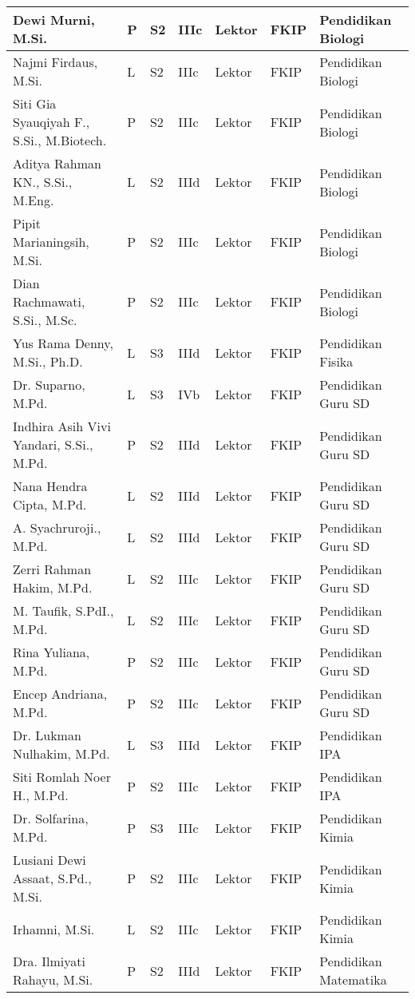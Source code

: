 \documentclass[
]{book}
\begin{document}
\begin{longtable}{l|l|l|l|l|l|l}
\hline
Dewi Murni, M.Si. & P & S2 & IIIc & Lektor & FKIP & Pendidikan Biologi\\
\hline
Najmi Firdaus, M.Si. & L & S2 & IIIc & Lektor & FKIP & Pendidikan Biologi\\
\hline
Siti Gia Syauqiyah F., S.Si., M.Biotech. & P & S2 & IIIc & Lektor & FKIP & Pendidikan Biologi\\
\hline
Aditya Rahman KN., S.Si., M.Eng. & L & S2 & IIId & Lektor & FKIP & Pendidikan Biologi\\
\hline
Pipit Marianingsih, M.Si. & P & S2 & IIIc & Lektor & FKIP & Pendidikan Biologi\\
\hline
Dian Rachmawati, S.Si., M.Sc. & P & S2 & IIIc & Lektor & FKIP & Pendidikan Biologi\\
\hline
Yus Rama Denny, M.Si., Ph.D. & L & S3 & IIId & Lektor & FKIP & Pendidikan Fisika\\
\hline
Dr. Suparno, M.Pd. & L & S3 & IVb & Lektor & FKIP & Pendidikan Guru SD\\
\hline
Indhira Asih Vivi Yandari, S.Si., M.Pd. & P & S2 & IIId & Lektor & FKIP & Pendidikan Guru SD\\
\hline
Nana Hendra Cipta, M.Pd. & L & S2 & IIId & Lektor & FKIP & Pendidikan Guru SD\\
\hline
A. Syachruroji., M.Pd. & L & S2 & IIId & Lektor & FKIP & Pendidikan Guru SD\\
\hline
Zerri Rahman Hakim, M.Pd. & L & S2 & IIIc & Lektor & FKIP & Pendidikan Guru SD\\
\hline
M. Taufik, S.PdI., M.Pd. & L & S2 & IIIc & Lektor & FKIP & Pendidikan Guru SD\\
\hline
Rina Yuliana, M.Pd. & P & S2 & IIIc & Lektor & FKIP & Pendidikan Guru SD\\
\hline
Encep Andriana, M.Pd. & P & S2 & IIIc & Lektor & FKIP & Pendidikan Guru SD\\
\hline
Dr. Lukman Nulhakim, M.Pd. & L & S3 & IIId & Lektor & FKIP & Pendidikan IPA\\
\hline
Siti Romlah Noer H., M.Pd. & P & S2 & IIIc & Lektor & FKIP & Pendidikan IPA\\
\hline
Dr. Solfarina, M.Pd. & P & S3 & IIIc & Lektor & FKIP & Pendidikan Kimia\\
\hline
Lusiani Dewi Assaat, S.Pd., M.Si. & P & S2 & IIIc & Lektor & FKIP & Pendidikan Kimia\\
\hline
Irhamni, M.Si. & L & S2 & IIIc & Lektor & FKIP & Pendidikan Kimia\\
\hline
Dra. Ilmiyati Rahayu, M.Si. & P & S2 & IIId & Lektor & FKIP & Pendidikan Matematika\\

\end{longtable}
\end{document}
